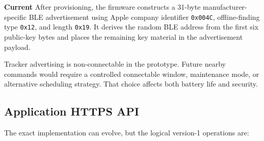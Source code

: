 \documentclass[12pt,a4paper]{article}
\newcommand{\currentstatus}{\textcolor{implemented}{\textbf{Current}}}
\newcommand{\code}[1]{\texttt{#1}}
\begin{document}
\currentstatus{} After provisioning, the firmware constructs a 31-byte
manufacturer-specific BLE advertisement using Apple company identifier
\code{0x004C}, offline-finding type \code{0x12}, and length \code{0x19}. It
derives the random BLE address from the first six public-key bytes and places
the remaining key material in the advertisement payload.

Tracker advertising is non-connectable in the prototype. Future nearby commands
would require a controlled connectable window, maintenance mode, or alternative
scheduling strategy. That choice affects both battery life and security.

\subsection{Application HTTPS API}

The exact implementation can evolve, but the logical version-1 operations are:
\end{document}
